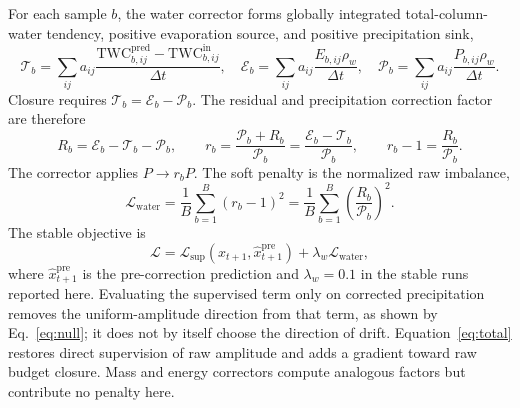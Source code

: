 \documentclass{ametsocV6.1}
\begin{document}
For each sample $b$, the water corrector forms globally integrated total-column-water tendency, positive evaporation source, and positive precipitation sink,
\begin{equation}
\mathcal{T}_b=\!\sum_{ij}a_{ij}\frac{\mathrm{TWC}^{\mathrm{pred}}_{b,ij}-\mathrm{TWC}^{\mathrm{in}}_{b,ij}}{\Delta t},\quad
\mathcal{E}_b=\!\sum_{ij}a_{ij}\frac{E_{b,ij}\rho_w}{\Delta t},\quad
\mathcal{P}_b=\!\sum_{ij}a_{ij}\frac{P_{b,ij}\rho_w}{\Delta t}.
\end{equation}
Closure requires $\mathcal{T}_b=\mathcal{E}_b-\mathcal{P}_b$. The residual and precipitation correction factor are therefore
\begin{equation}
R_b=\mathcal{E}_b-\mathcal{T}_b-\mathcal{P}_b,\qquad
r_b=\frac{\mathcal{P}_b+R_b}{\mathcal{P}_b}=\frac{\mathcal{E}_b-\mathcal{T}_b}{\mathcal{P}_b},\qquad
r_b-1=\frac{R_b}{\mathcal{P}_b}.
\end{equation}
The corrector applies $P\!\to\!r_bP$. The soft penalty is the normalized raw imbalance,
\begin{equation}
\mathcal{L}_{\mathrm{water}}=\frac{1}{B}\sum_{b=1}^{B}(r_b-1)^2=\frac{1}{B}\sum_{b=1}^{B}\left(\frac{R_b}{\mathcal{P}_b}\right)^2.
\end{equation}
The stable objective is
\begin{equation}
\mathcal{L}=\mathcal{L}_{\mathrm{sup}}\!\left(x_{t+1},\hat x^{\mathrm{pre}}_{t+1}\right)+\lambda_w\mathcal{L}_{\mathrm{water}},
\label{eq:total}
\end{equation}
where $\hat x^{\mathrm{pre}}_{t+1}$ is the pre-correction prediction and $\lambda_w=0.1$ in the stable runs reported here. Evaluating the supervised term only on corrected precipitation removes the uniform-amplitude direction from that term, as shown by Eq.~\eqref{eq:null}; it does not by itself choose the direction of drift. Equation~\eqref{eq:total} restores direct supervision of raw amplitude and adds a gradient toward raw budget closure. Mass and energy correctors compute analogous factors but contribute no penalty here.



\end{document}
